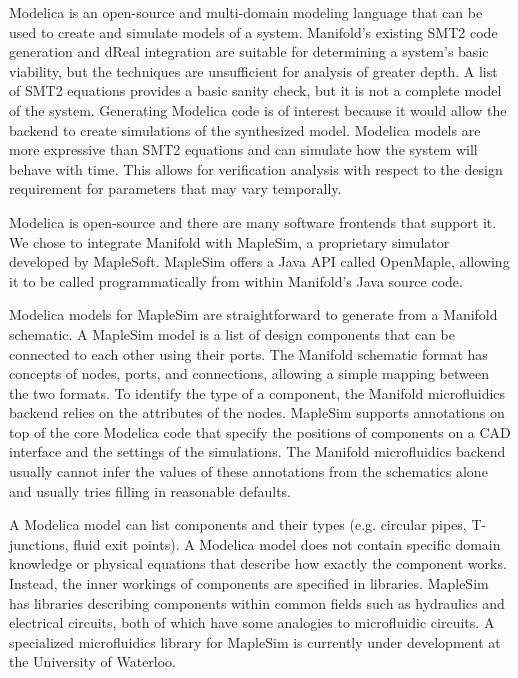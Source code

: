 Modelica is an open-source and multi-domain modeling language that can be used
to create and simulate models of a system.
Manifold's existing SMT2 code generation and dReal integration are suitable for
determining a system's basic viability, but the techniques are unsufficient for
analysis of greater depth.
A list of SMT2 equations provides a basic sanity check, but it is not a complete model of the system.
Generating Modelica code is of interest because it would allow the backend to create simulations of the synthesized model.
Modelica models are more expressive than SMT2 equations and can simulate how the system will behave with time. 
This allows for verification analysis
with respect to the design requirement for parameters that may vary temporally. %

Modelica is open-source and there are many software frontends that support it.
We chose to integrate Manifold with MapleSim, a proprietary simulator developed by MapleSoft.
MapleSim offers a Java API called OpenMaple, allowing it to be called programmatically from within Manifold's Java source code.

Modelica models for MapleSim are straightforward to generate from a Manifold schematic.
A MapleSim model is a list of design components that can be connected to each other using their ports.
The Manifold schematic format has concepts of nodes, ports, and connections, allowing a simple mapping between the two formats.
To identify the type of a component, the Manifold microfluidics backend relies on the attributes of the nodes.
MapleSim supports annotations on top of the core Modelica code that specify the positions of components on a CAD interface and the settings of the simulations.
The Manifold microfluidics backend usually cannot infer the values of these annotations from the schematics alone and usually tries filling in reasonable defaults.

A Modelica model can list components and their types (e.g. circular pipes, T-junctions, fluid exit points).
A Modelica model does not contain specific domain knowledge or physical equations that describe how exactly the component works.
Instead, the inner workings of components are specified in libraries.
MapleSim has libraries describing components within common fields such as hydraulics and electrical circuits, both of which have some analogies to microfluidic circuits.
A specialized microfluidics library for MapleSim is currently under development at the University of Waterloo.

